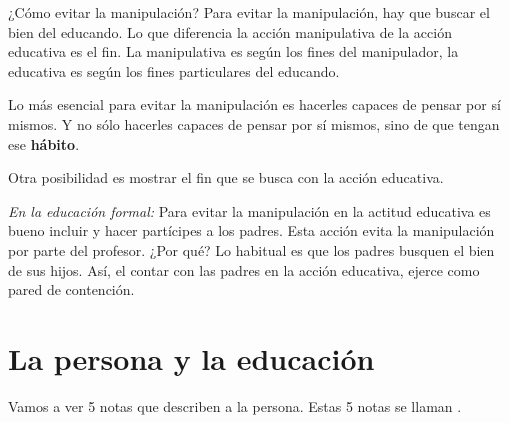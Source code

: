\documentclass[palatino]{apuntesURJC}
\begin{document}
¿Cómo evitar la manipulación?
%
Para evitar la manipulación, hay que buscar el bien del educando.
%
Lo que diferencia la acción manipulativa de la acción educativa es el fin.
%
La manipulativa es según los  fines del manipulador, la educativa es según los fines particulares del educando.

Lo más esencial para evitar la manipulación es hacerles capaces de pensar por sí mismos.
%
Y no sólo hacerles capaces de pensar por sí mismos, sino de que tengan ese \textbf{hábito}.

Otra posibilidad es mostrar el fin que se busca con la acción educativa.


\textit{En la educación formal:}
Para evitar la manipulación en la actitud educativa es bueno incluir y hacer partícipes a los padres.
%
Esta acción evita la manipulación por parte del profesor. ¿Por qué?
%
Lo habitual es que los padres busquen el bien de sus hijos. Así, el contar con las padres en la acción educativa, ejerce como pared de contención.


\section{La persona y la educación}

Vamos a ver 5 notas que describen a la persona. Estas 5 notas se llaman .
\end{document}
